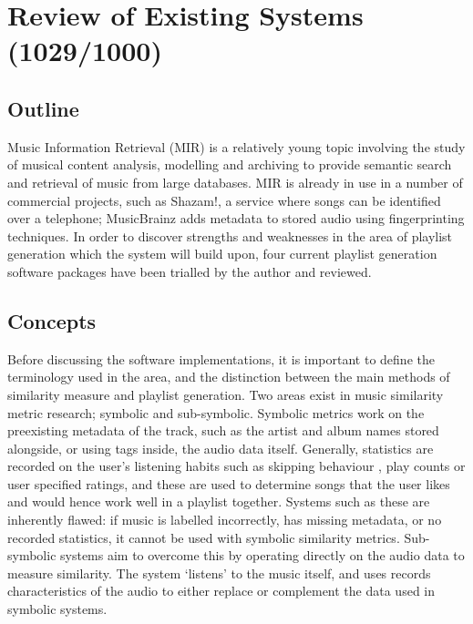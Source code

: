 \chapter{Review of Existing Systems (1029/1000)}
\section{Outline}
Music Information Retrieval (MIR) is a relatively young topic involving the study of musical content analysis, modelling and archiving to provide semantic search and retrieval of music from large databases. MIR is already in use in a number of commercial projects, such as Shazam!, a service where songs can be identified over a telephone; MusicBrainz adds metadata to stored audio using fingerprinting techniques. 
In order to discover strengths and weaknesses in the area of playlist generation which the system will build upon, four current playlist generation software packages have been trialled by the author and reviewed.
\section{Concepts}
Before discussing the software implementations, it is important to define the terminology used in the area, and the distinction between the main methods of similarity measure and playlist generation. Two areas exist in music similarity metric research; symbolic and sub-symbolic. Symbolic metrics work on the preexisting metadata of the track, such as the artist and album names stored alongside, or using  tags inside, the audio data itself. Generally, statistics are recorded on the user's listening habits such as skipping behaviour \citep{Pampalk2005a}, play counts or user specified ratings, and these are used to determine songs that the user likes and would hence work well in a playlist together. Systems such as these are inherently flawed: if music is labelled incorrectly, has missing metadata, or no recorded statistics, it cannot be used with symbolic similarity metrics. Sub-symbolic systems aim to overcome this by operating directly on the audio data to measure similarity. The system `listens' to the music itself, and uses records characteristics of the audio to either replace or complement the data used in symbolic systems.

